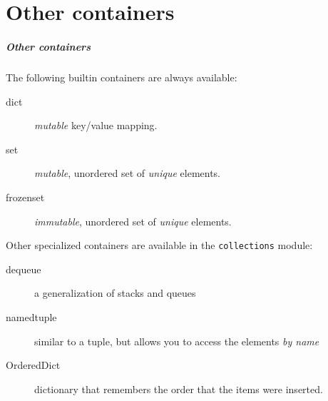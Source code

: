 \documentclass[english,serif,mathserif,xcolor=pdftex,dvipsnames,table]{beamer}
\begin{document}
\part{Other containers}
\begin{frame}
  \frametitle{Other containers}

  The following builtin containers are always available:
  \begin{description}
  \item[dict] \textit{mutable} key/value mapping.
  \item[set] \textit{mutable}, unordered set of \textit{unique} elements.
  \item[frozenset] \textit{immutable}, unordered set of
    \textit{unique} elements.
  \end{description}

  \pause
  Other specialized containers are available in the
  \texttt{collections} module:

  \begin{description}
  \item[dequeue] a generalization of stacks and queues
  \item[namedtuple] similar to a tuple, but allows you to access the
    elements \textit{by name}
  \item[OrderedDict] dictionary that remembers the order that the
    items were inserted.
  \end{description}
\end{frame}
\end{document}
